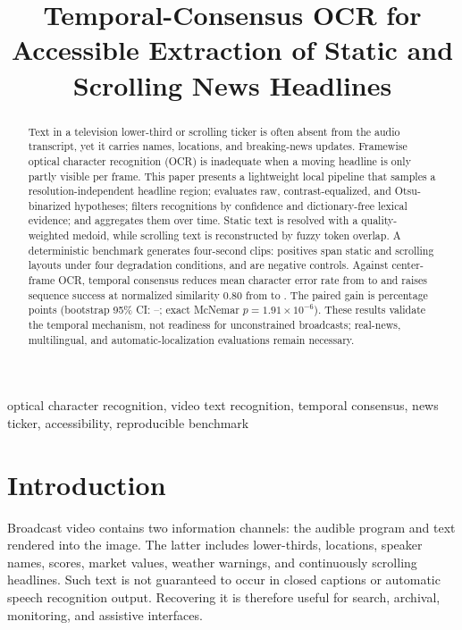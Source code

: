 \documentclass[conference]{IEEEtran}
\title{Temporal-Consensus OCR for Accessible Extraction of Static and Scrolling News Headlines}
\author{\IEEEauthorblockN{Sukhraj Singh}
\IEEEauthorblockA{Faculty of Computer Science and Technology\\
Algoma University, Brampton, Ontario, Canada}}
\begin{document}
\maketitle

\begin{abstract}
Text in a television lower-third or scrolling ticker is often absent from the audio transcript,
yet it carries names, locations, and breaking-news updates.  Framewise optical character
recognition (OCR) is inadequate when a moving headline is only partly visible per frame.  This
paper presents a lightweight local pipeline that samples a resolution-independent headline
region; evaluates raw, contrast-equalized, and Otsu-binarized hypotheses; filters recognitions by
confidence and dictionary-free lexical evidence; and aggregates them over time.  Static text is
resolved with a quality-weighted medoid, while scrolling text is reconstructed by fuzzy token
overlap.  A deterministic benchmark generates \BenchmarkClips{} four-second clips: \PositiveClips{}
positives span static and scrolling layouts under four degradation conditions, and
\NegativeClips{} are negative controls.  Against center-frame OCR, temporal consensus reduces
mean character error rate from \BaselineCER{} to \TemporalCER{} and raises sequence success at
normalized similarity 0.80 from \BaselineSuccess{} to \TemporalSuccess{}.  The paired gain is
\SuccessDifference{} percentage points (bootstrap 95\% CI: \BootstrapLow{}--\BootstrapHigh{};
exact McNemar $p=1.91\times10^{-6}$).  These results validate the temporal mechanism, not readiness
for unconstrained broadcasts; real-news, multilingual, and automatic-localization evaluations
remain necessary.
\end{abstract}

\begin{IEEEkeywords}
optical character recognition, video text recognition, temporal consensus, news ticker,
accessibility, reproducible benchmark
\end{IEEEkeywords}

\section{Introduction}

Broadcast video contains two information channels: the audible program and text rendered into
the image.  The latter includes lower-thirds, locations, speaker names, scores, market values,
weather warnings, and continuously scrolling headlines.  Such text is not guaranteed to occur
in closed captions or automatic speech recognition output.  Recovering it is therefore useful
for search, archival, monitoring, and assistive interfaces.
\end{document}

